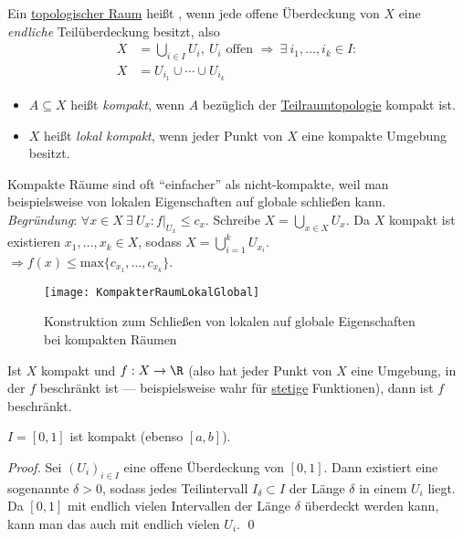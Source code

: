 \begin{definition}\label{def:kompakt}
  Ein \hyperref[def:topologie]{topologischer Raum} heißt , wenn jede offene Überdeckung von \( X \) eine \emph{endliche} Teilüberdeckung besitzt, also
  \begin{align*}
    X &= \bigcup_{i \in I} U_i, \ U_i \text{ offen } \Rightarrow \ \exists \ i_1, \dots, i_k \in I : \\
    X &= U_{i_1} \cup \cdots \cup U_{i_k}
  \end{align*}
  \begin{itemize}
    \item \( A \subseteq X \) heißt \emph{kompakt}, wenn \( A \) bezüglich der \hyperref[def:teilraumtopologie]{Teilraumtopologie} kompakt ist.
    \item \( X \) heißt \emph{lokal kompakt}, wenn jeder Punkt von \( X \) eine kompakte Umgebung besitzt.
  \end{itemize}
\end{definition}

\begin{remark}
  Kompakte Räume sind oft ``einfacher'' als nicht-kompakte, weil man beispielsweise von lokalen Eigenschaften auf globale schließen kann. \\
  \emph{Begründung}: \( \forall x \in X \ \exists \ U_x : f\vert_{U_x} \leq c_x \). Schreibe \( X = \bigcup_{x \in X}U_x \). Da \( X \) kompakt ist existieren \( x_1, \dots, x_k \in X \), sodass \( X = \bigcup_{i=1}^k U_{x_i} \). \\
  \( \Rightarrow f(x) \leq \text{max}\{ c_{x_1}, \dots, c_{x_k} \} \).
  \begin{figure}[H]
    \texttt{[image: KompakterRaumLokalGlobal]}
    \caption{Konstruktion zum Schließen von lokalen auf globale Eigenschaften bei kompakten Räumen}
  \end{figure}
\end{remark}

\begin{example}\label{bsp:beschraenkt}
  Ist \( X \) kompakt und \( f: X \to \R \)  (also hat jeder Punkt von \( X \) eine Umgebung, in der \( f \) beschränkt ist --- beispielsweise wahr für \hyperref[def:stetig]{stetige} Funktionen), dann ist \( f \) beschränkt.
\end{example}

\begin{example}
  \( I = [0,1] \) ist kompakt (ebenso \( [a,b] \)).
  \begin{proof}
    Sei \( {(U_i)}_{i \in I} \) eine offene Überdeckung von \( [0,1] \). Dann existiert eine sogenannte \label{def:lebesgueZahl} \( \delta > 0 \), sodass jedes Teilintervall \( I_\delta \subset I \) der Länge \( \delta \) in einem \( U_i \) liegt. Da \( [0,1] \) mit endlich vielen Intervallen der Länge \( \delta \) überdeckt werden kann, kann man das auch mit endlich vielen \( U_i \). \qed{}
  \end{proof}
\end{example}

